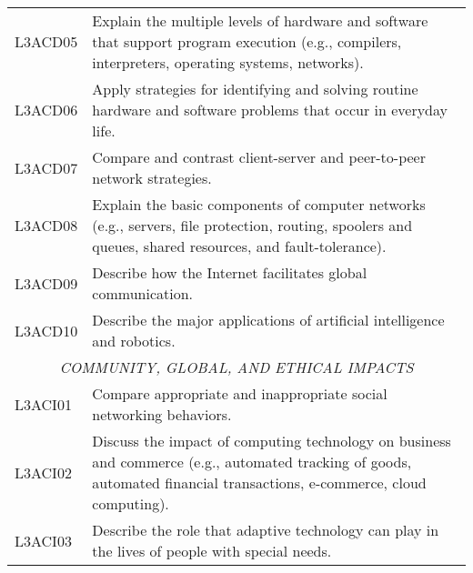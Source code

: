 \begin{longtable}{p{1.8cm}p{11cm}}
 L3ACD05 & Explain the multiple levels of hardware and software that support program execution (e.g., compilers, interpreters, operating systems, networks).                                                                          \\
 L3ACD06 & Apply strategies for identifying and solving routine hardware and software problems that occur in everyday life.                                                                                                           \\
 L3ACD07 & Compare and contrast client-server and peer-to-peer network strategies.                                                                                                                                                    \\
 L3ACD08 & Explain the basic components of computer networks (e.g., servers, file protection, routing, spoolers and queues, shared resources, and fault-tolerance).                                                                   \\
 L3ACD09 & Describe how the Internet facilitates global communication.                                                                                                                                                                \\
 L3ACD10 & Describe the major applications of artificial intelligence and robotics.                                                                                                                                                   \\
 \multicolumn{2}{c}{\textit{COMMUNITY, GLOBAL, AND ETHICAL IMPACTS}}                                                                                                                                                                                 \\
 L3ACI01 & Compare appropriate and inappropriate social networking behaviors.                                                                                                                                                         \\
 L3ACI02 & Discuss the impact of computing technology on business and commerce (e.g., automated tracking of goods, automated financial transactions, e-commerce, cloud computing).                                                    \\
 L3ACI03 & Describe the role that adaptive technology can play in the lives of people with special needs.                                                                                                                             \\

\end{longtable}
